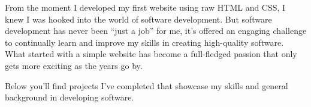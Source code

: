

\begin{custom1}
\begin{cvparagraph}

From the moment I developed my first website using raw HTML and CSS, I knew I was hooked into the world of software development. But software development has never been “just a job” for me, it’s offered an engaging challenge to continually learn and improve my skills in creating high-quality software. What started with a simple website has become a full-fledged passion that only gets more exciting as the years go by.

Below you’ll find projects I’ve completed that showcase my skills and general background in developing software.

\end{cvparagraph}
\end{custom1}


